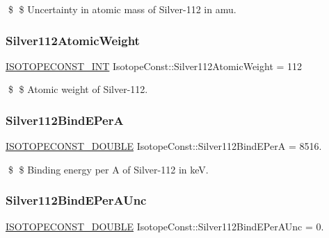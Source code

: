 \$ \$ Uncertainty in atomic mass of Silver-\/112 in amu. \mbox{\label{group___isotope_const-_silver-_ag112_gada1bbebef650de5857e26775cda9c76e}} 
\subsubsection{\texorpdfstring{Silver112\+Atomic\+Weight}{Silver112AtomicWeight}}
{\footnotesize\ttfamily \mbox{\hyperlink{group___isotope_const-_macros_ga5f18360b3e99483a35c32d789e62621c}{I\+S\+O\+T\+O\+P\+E\+C\+O\+N\+S\+T\+\_\+\+I\+NT}} Isotope\+Const\+::\+Silver112\+Atomic\+Weight = 112}

\$ \$ Atomic weight of Silver-\/112. \mbox{\label{group___isotope_const-_silver-_ag112_gadb714ee974b1c1e53df7749f53f3fd1c}} 
\subsubsection{\texorpdfstring{Silver112\+Bind\+E\+PerA}{Silver112BindEPerA}}
{\footnotesize\ttfamily \mbox{\hyperlink{group___isotope_const-_macros_ga8f45a7272ce02c0b4c65c44636ed719a}{I\+S\+O\+T\+O\+P\+E\+C\+O\+N\+S\+T\+\_\+\+D\+O\+U\+B\+LE}} Isotope\+Const\+::\+Silver112\+Bind\+E\+PerA = 8516.}

\$ \$ Binding energy per A of Silver-\/112 in keV. \mbox{\label{group___isotope_const-_silver-_ag112_gaad30795a3e9fc4666faedb0d3e5caf4d}} 
\subsubsection{\texorpdfstring{Silver112\+Bind\+E\+Per\+A\+Unc}{Silver112BindEPerAUnc}}
{\footnotesize\ttfamily \mbox{\hyperlink{group___isotope_const-_macros_ga8f45a7272ce02c0b4c65c44636ed719a}{I\+S\+O\+T\+O\+P\+E\+C\+O\+N\+S\+T\+\_\+\+D\+O\+U\+B\+LE}} Isotope\+Const\+::\+Silver112\+Bind\+E\+Per\+A\+Unc = 0.}

